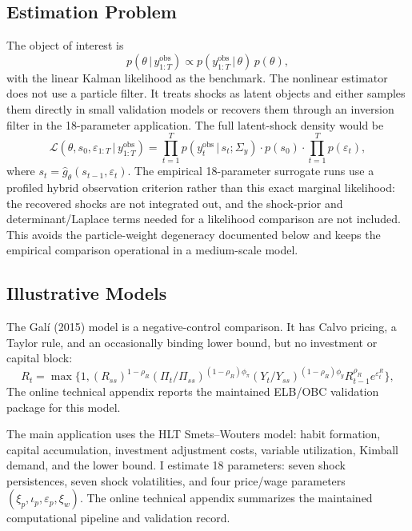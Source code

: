 \documentclass[12pt]{article}
\theoremstyle{plain}
\theoremstyle{definition}
\theoremstyle{remark}
\newcommand{\given}{\,|\,}
\newcommand{\eps}{\varepsilon}
\newcommand{\Sigmay}{\Sigma_y}
\begin{document}
\subsection{Estimation Problem}

The object of interest is
\begin{equation}
\label{eq:posterior}
p(\theta \given y_{1:T}^{\text{obs}}) \propto p(y_{1:T}^{\text{obs}} \given \theta) \, p(\theta),
\end{equation}
with the linear Kalman likelihood as the benchmark. The nonlinear estimator
does not use a particle filter. It treats shocks as latent objects and either
samples them directly in small validation models or recovers them through an
inversion filter in the 18-parameter application. The full latent-shock density
would be
\begin{equation*}
\mathcal{L}(\theta, s_0, \eps_{1:T} \given y_{1:T}^{\text{obs}}) = \prod_{t=1}^T p(y_t^{\text{obs}} \given s_t; \Sigmay) \cdot p(s_0) \cdot \prod_{t=1}^T p(\eps_t),
\end{equation*}
where \(s_t=\hat g_\theta(s_{t-1},\eps_t)\). The empirical 18-parameter
surrogate runs use a profiled hybrid observation criterion rather than this
exact marginal likelihood: the recovered shocks are not integrated out, and the
shock-prior and determinant/Laplace terms needed for a likelihood comparison
are not included. This avoids the particle-weight degeneracy documented below
and keeps the empirical comparison operational in a medium-scale model.

\subsection{Illustrative Models}
\label{subsec:gali_model}

The Gal\'i (2015) model is a negative-control comparison. It has Calvo pricing,
a Taylor rule, and an occasionally binding lower bound, but no investment or
capital block:
\[
R_t = \max\{1, (R_{ss})^{1-\rho_R}(\Pi_t/\Pi_{ss})^{(1-\rho_R)\phi_\pi}(Y_t/Y_{ss})^{(1-\rho_R)\phi_y}R_{t-1}^{\rho_R}e^{\varepsilon_t^R}\},
\]
The online technical appendix reports the maintained ELB/OBC validation
package for this model.

The main application uses the HLT Smets--Wouters model: habit formation, capital
accumulation, investment adjustment costs, variable utilization, Kimball
demand, and the lower bound. I estimate 18 parameters: seven shock
persistences, seven shock volatilities, and four price/wage parameters
\((\xi_p,\iota_p,\varepsilon_p,\xi_w)\). The online technical appendix
summarizes the maintained computational pipeline and validation record.
\end{document}
